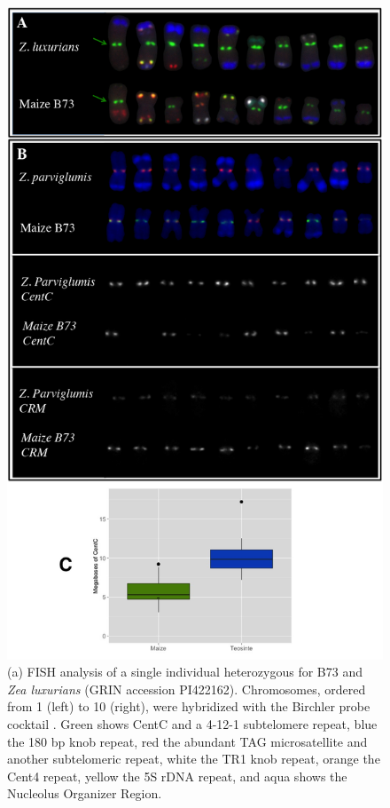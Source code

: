 \begin{figure}
\centering
\includegraphics[width=1\textwidth]{Fig4_kelly2}
\caption{(a) FISH analysis of a single individual heterozygous for B73 and \emph{Zea luxurians} (GRIN accession PI422162).
Chromosomes, ordered from 1 (left) to 10 (right), were hybridized with the Birchler probe cocktail \citep{kato2004paint}. 
Green shows CentC and a 4-12-1 subtelomere repeat, blue the 180 bp knob repeat, red the abundant TAG microsatellite and another subtelomeric repeat, white the TR1 knob repeat, orange the Cent4 repeat, yellow the 5S rDNA repeat, and aqua shows the Nucleolus Organizer Region.
}
\end{figure}
